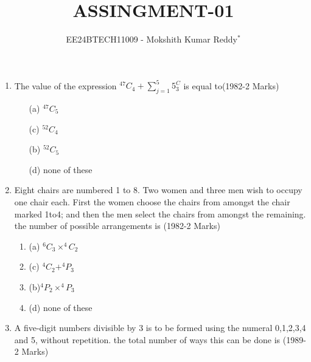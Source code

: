 \documentclass[journal,12pt,twocolumn]{IEEEtran}
\theoremstyle{remark}
\begin{document}

\vspace{3cm}

\title{ASSINGMENT-01}
\author{EE24BTECH11009 - Mokshith Kumar Reddy$^{*}$%
}
\maketitle
\newpage
\bigskip
\begin{enumerate}[start=3]
\item  The value of the expression $^{47}C_4+\sum\limits_{j=1}^{5} 5^C_3$ is equal to\hfill{(1982-2 Marks)}\\
\begin{multicols}{2} 
\begin{enumerate}
[label=, left=0pt, labelsep=0pt, itemsep=1em]
\item[(a)] $^{47}C_5$
\item[(c)]$^{52}C_4$
\item[(b)] $^{52}C_5$
\item[(d)] none of these\\
\end{enumerate}
\end{multicols}
\item Eight chairs are numbered 1 to 8. Two women and three men wish to occupy one chair each. First the women choose the chairs from amongst the chair marked 1to4; and then the men select the chairs from amongst the remaining. the number of possible arrangements is
\hfill{(1982-2 Marks)}\\
\begin{multicols}{2} 
\begin{enumerate}
[label=, left=0pt, labelsep=0pt, itemsep=1em]
\item(a) $^6C_3\times^4C_2$
\item(c) $^4C_2+^4P_3$
\item(b)$^4P_2\times^4P_3$
\item(d) none of these\\[4pt]
\end{enumerate}
\end{multicols}
\item A five-digit numbers divisible by 3 is to be formed using the numeral 0,1,2,3,4 and 5, without repetition. the total number of ways this can be done is
\hfill{(1989-2 Marks)}\\
\begin{multicols}{2} 
\begin{enumerate}
[label=, left=0pt, labelsep=0pt, itemsep=1em]

\end{enumerate}
\end{multicols}
\end{enumerate}
\end{document}
